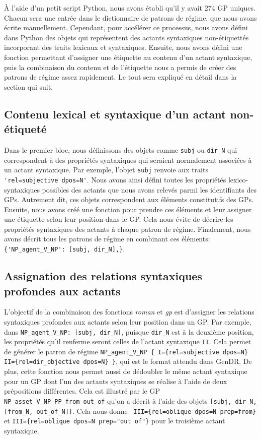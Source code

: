 À l'aide d'un petit script Python, nous avons établi qu'il y avait 274 \ac{GP} uniques. Chacun sera une entrée dans le dictionnaire de patrons de régime, que nous avons écrite manuellement. Cependant, pour accélérer ce processus, nous avons défini dans Python des objets qui représentent des actants syntaxiques non-étiquettés incorporant des traits lexicaux et syntaxiques. Ensuite, nous avons défini une fonction permettant d'assigner une étiquette au contenu d'un actant syntaxique, puis la combinaison du contenu et de l'étiquette nous a permis de créer des patrons de régime assez rapidement. Le tout sera expliqué en détail dans la section qui suit.

\subsection{Contenu lexical et syntaxique d'un actant non-étiqueté}

Dans le premier bloc, nous définissons des objets comme \texttt{subj} ou \texttt{dir\_N} qui correspondent à des propriétés syntaxiques qui seraient normalement associées à un actant syntaxique. Par exemple, l'objet \texttt{subj} renvoie aux traits \lstinline|'rel=subjective dpos=N'|. Nous avons ainsi défini toutes les propriétés lexico-syntaxiques possibles des actants que nous avons relevés parmi les identifiants des \acp{GP}. Autrement dit, ces objets correspondent aux éléments constitutifs des \acp{GP}. Ensuite, nous avons créé une fonction pour prendre ces éléments et leur assigner une étiquette selon leur position dans le \ac{GP}. Cela nous évite de décrire les propriétés syntaxiques des actants à chaque patron de régime. Finalement, nous avons décrit tous les patrons de régime en combinant ces éléments: \lstinline|{'NP_agent_V_NP': [subj, dir_N],}|.

\subsection{Assignation des relations syntaxiques profondes aux actants}

L'objectif de la combinaison des fonctions \emph{roman} et \emph{gp} est d'assigner les relations syntaxiques profondes aux actants selon leur position dans un \ac{GP}. Par exemple, dans \lstinline|NP_agent_V_NP: [subj, dir_N]|, puisque \texttt{dir\_N} est à la deuxième position, les propriétés qu'il renferme seront celles de l'actant syntaxique \texttt{II}. Cela permet de générer le patron de régime \lstinline|NP_agent_V_NP { I={rel=subjective dpos=N} II={rel=dir_objective dpos=N} }|, qui est le format attendu dans GenDR. De plus, cette fonction nous permet aussi de dédoubler le même actant syntaxique pour un \ac{GP} dont l'un des actants syntaxiques se réalise à l'aide de deux prépositions différentes. Cela est illustré par le \ac{GP} \lstinline|NP_asset_V_NP_PP_from_out_of| qu'on a décrit à l'aide des objets \lstinline|[subj, dir_N, [from_N, out_of_N]]|. Cela nous donne \lstinline| III={rel=oblique dpos=N prep=from}| et \lstinline|III={rel=oblique dpos=N prep="out of"}| pour le troisième actant syntaxique.

